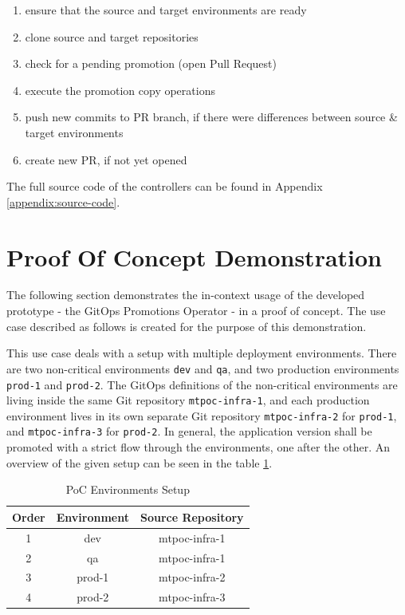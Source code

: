 \begin{enumerate}
	\item ensure that the source and target environments are ready
	\item clone source and target repositories
	\item check for a pending promotion (open Pull Request)
	\item execute the promotion copy operations
	\item push new commits to PR branch, if there were differences between source \& target environments
	\item create new PR, if not yet opened
\end{enumerate}

The full source code of the controllers can be found in Appendix
\ref{appendix:source-code}.






\section{Proof Of Concept Demonstration}

The following section demonstrates the in-context usage of the
developed prototype - the GitOps Promotions Operator - in a proof of concept.
The use case described as follows is created for the purpose of this demonstration.

This use case deals with a setup with multiple deployment environments.
There are two non-critical environments \lstinline|dev| and \lstinline|qa|,
and two production environments \lstinline|prod-1| and \lstinline|prod-2|.
The GitOps definitions of the non-critical environments are living inside the same
Git repository \lstinline|mtpoc-infra-1|,
and each production environment lives in its own separate Git repository
\lstinline|mtpoc-infra-2| for \lstinline|prod-1|,
and \lstinline|mtpoc-infra-3| for \lstinline|prod-2|.
In general, the application version shall be promoted with a strict flow
through the environments, one after the other.
An overview of the given setup can be seen in the table \ref{table:poc-environments-setup}.

\begin{table}[h]
\begin{center}
	\begin{tabular}{||c c c||} 
		\hline
		Order & Environment & Source Repository \\ [0.5ex] 
		\hline\hline
		1 & dev & mtpoc-infra-1 \\ 
		\hline
		2 & qa & mtpoc-infra-1 \\
		\hline
		3 & prod-1 & mtpoc-infra-2 \\
		\hline
		4 & prod-2 & mtpoc-infra-3 \\
		\hline
	\end{tabular}
	\caption{PoC Environments Setup}
	\label{table:poc-environments-setup}
\end{center}
\end{table}

